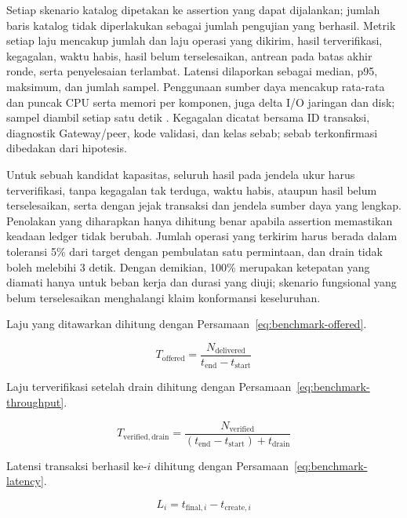 Setiap skenario katalog dipetakan ke assertion yang dapat dijalankan; jumlah
baris katalog tidak diperlakukan sebagai jumlah pengujian yang berhasil.
Metrik setiap laju mencakup jumlah dan laju operasi yang dikirim, hasil
terverifikasi, kegagalan, waktu habis, hasil belum terselesaikan, antrean pada
batas akhir ronde, serta penyelesaian terlambat. Latensi dilaporkan sebagai
median, p95, maksimum, dan jumlah sampel. Penggunaan sumber daya mencakup
rata-rata dan puncak CPU serta memori per komponen, juga delta I/O jaringan dan
disk; sampel diambil setiap satu detik \cite{hlf_metrics}. Kegagalan dicatat
bersama ID transaksi, diagnostik Gateway/peer, kode validasi, dan kelas sebab;
sebab terkonfirmasi dibedakan dari hipotesis.

Untuk sebuah kandidat kapasitas, seluruh hasil pada jendela ukur harus
terverifikasi, tanpa kegagalan tak terduga, waktu habis, ataupun hasil belum
terselesaikan, serta dengan jejak transaksi dan jendela sumber daya yang lengkap.
Penolakan yang diharapkan hanya dihitung benar apabila assertion
memastikan keadaan ledger tidak berubah. Jumlah operasi yang terkirim harus
berada dalam toleransi 5\% dari target dengan pembulatan satu permintaan, dan
drain tidak boleh melebihi 3 detik. Dengan demikian, 100\% merupakan ketepatan yang diamati hanya untuk
beban kerja dan durasi yang diuji; skenario fungsional yang belum terselesaikan
menghalangi klaim konformansi keseluruhan.

Laju yang ditawarkan dihitung dengan Persamaan~\ref{eq:benchmark-offered}.

\begin{equation}
    T_{\mathrm{offered}} = \frac{N_{\mathrm{delivered}}}{t_{\mathrm{end}} - t_{\mathrm{start}}}
    \label{eq:benchmark-offered}
\end{equation}

Laju terverifikasi setelah drain dihitung dengan Persamaan~\ref{eq:benchmark-throughput}.

\begin{equation}
    T_{\mathrm{verified,drain}} = \frac{N_{\mathrm{verified}}}{(t_{\mathrm{end}} - t_{\mathrm{start}}) + t_{\mathrm{drain}}}
    \label{eq:benchmark-throughput}
\end{equation}

Latensi transaksi berhasil ke-$i$ dihitung dengan Persamaan~\ref{eq:benchmark-latency}.

\begin{equation}
    L_i = t_{\mathrm{final},i} - t_{\mathrm{create},i}
    \label{eq:benchmark-latency}
\end{equation}


